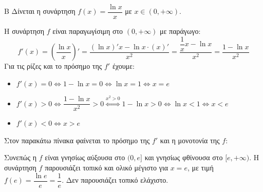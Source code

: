 \begin{thema}{Β}
Δίνεται η συνάρτηση $f(x) = \dfrac{\ln x}{x}$ με $x \in (0, +\infty)$.

\begin{erwthma}
\item Η συνάρτηση $f$ είναι παραγωγίσιμη στο $(0, +\infty)$ με παράγωγο:
\[ f'(x) = \left( \dfrac{\ln x}{x} \right)' = \dfrac{(\ln x)' x - \ln x \cdot (x)'}{x^2} = \dfrac{\dfrac{1}{x}x - \ln x}{x^2} = \dfrac{1 - \ln x}{x^2} \]
Για τις ρίζες και το πρόσημο της $f'$ έχουμε:
\begin{itemize}
    \item $f'(x) = 0 \Leftrightarrow 1 - \ln x = 0 \Leftrightarrow \ln x = 1 \Leftrightarrow x = e$
    \item $f'(x) > 0 \Leftrightarrow \dfrac{1 - \ln x}{x^2} > 0 \stackrel{x^2>0}{\Leftrightarrow} 1 - \ln x > 0 \Leftrightarrow \ln x < 1 \Leftrightarrow x < e$
    \item $f'(x) < 0 \Leftrightarrow x > e$
\end{itemize}
Στον παρακάτω πίνακα φαίνεται το πρόσημο της $f'$ και η μονοτονία της $f$:
\begin{center}
\end{center}
Συνεπώς η $f$ είναι γνησίως αύξουσα στο $(0, e]$ και γνησίως φθίνουσα στο $[e, +\infty)$.
Η συνάρτηση $f$ παρουσιάζει τοπικό και ολικό μέγιστο για $x = e$, με τιμή $f(e) = \dfrac{\ln e}{e} = \dfrac{1}{e}$. Δεν παρουσιάζει τοπικό ελάχιστο.


\end{erwthma}
\end{thema}
